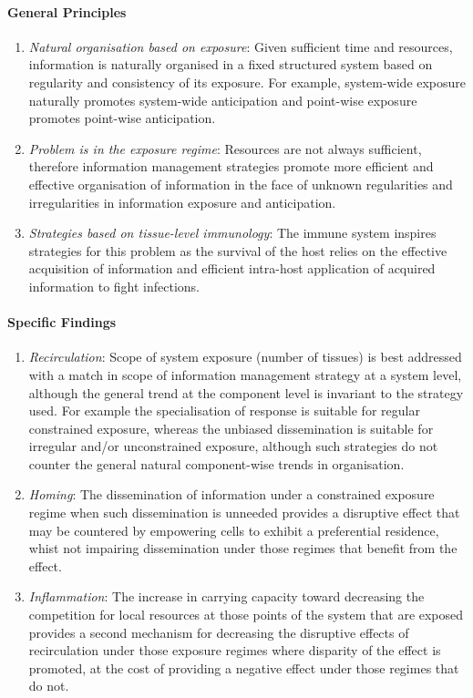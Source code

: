 \paragraph{General Principles}
		\begin{enumerate}
			\item \emph{Natural organisation based on exposure}: Given sufficient time and resources, information is naturally organised in a fixed structured system based on regularity and consistency of its exposure. For example, system-wide exposure naturally promotes system-wide anticipation and point-wise exposure promotes point-wise anticipation.
			\item \emph{Problem is in the exposure regime}: Resources are not always sufficient, therefore information management strategies promote more efficient and effective organisation of information in the face of unknown regularities and irregularities in information exposure and anticipation.
			\item \emph{Strategies based on tissue-level immunology}: The immune system inspires strategies for this problem as the survival of the host relies on the effective acquisition of information and efficient intra-host application of acquired information to fight infections.
		\end{enumerate}

\paragraph{Specific Findings}
		\begin{enumerate}
			\item \emph{Recirculation}: Scope of system exposure (number of tissues) is best addressed with a match in scope of information management strategy at a system level, although the general trend at the component level is invariant to the strategy used. For example the specialisation of response is suitable for regular constrained exposure, whereas the unbiased dissemination is suitable for irregular and/or unconstrained exposure, although such strategies do not counter the general natural component-wise trends in organisation.
			\item \emph{Homing}: The dissemination of information under a constrained exposure regime when such dissemination is unneeded provides a disruptive effect that may be countered by empowering cells to exhibit a preferential residence, whist not impairing dissemination under those regimes that benefit from the effect.
			\item \emph{Inflammation}: The increase in carrying capacity toward decreasing the competition for local resources at those points of the system that are exposed provides a second mechanism for decreasing the disruptive effects of recirculation under those exposure regimes where disparity of the effect is promoted, at the cost of providing a negative effect under those regimes that do not.
		\end{enumerate}	

